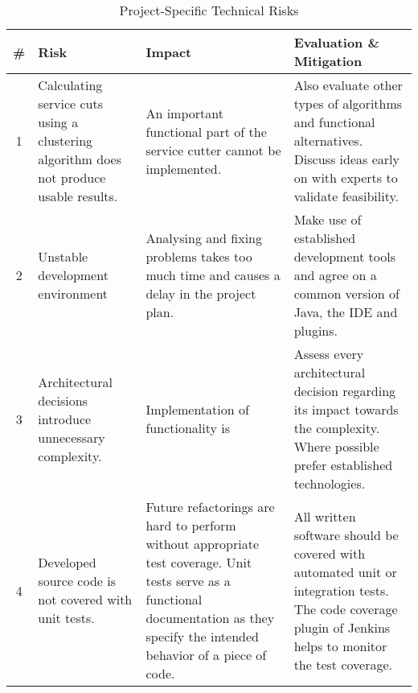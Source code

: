 \begin{table}[H]
\begin{tabular}{|c|p{80pt} p{140pt} p{140pt}|}
	\hline \# & Risk & Impact & Evaluation \& Mitigation \\ 
	\hline 1 & Calculating service cuts using a clustering algorithm does not produce usable results. & An important functional part of the service cutter cannot be implemented. & Also evaluate other types of algorithms and functional alternatives. Discuss ideas early on with experts to validate feasibility. \\ 
	2 & Unstable development environment & Analysing and fixing problems takes too much time and causes a delay in the project plan. & Make use of established development tools and agree on a common version of Java, the IDE and plugins. \\ 
	3 & Architectural decisions introduce unnecessary complexity. & Implementation of functionality is  & Assess every architectural decision regarding its impact towards the complexity. Where possible prefer established technologies. \\ 
	4 & Developed source code is not covered with unit tests. & Future refactorings are hard to perform without appropriate test coverage. Unit tests serve as a functional documentation as they specify the intended behavior of a piece of code. & All written software should be covered with automated unit or integration tests. The code coverage plugin of Jenkins helps to monitor the test coverage. \\ 
	\hline
\end{tabular}
\caption{Project-Specific Technical Risks}
\label{tab:projtechnicalrisks}
\end{table}


